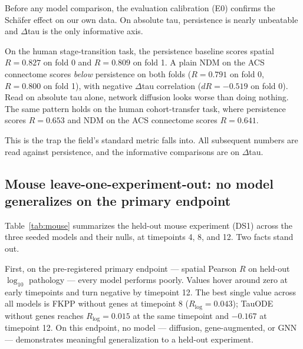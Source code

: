 \documentclass{article}
\begin{document}
Before any model comparison, the evaluation calibration (E0) confirms the Sch\"afer effect on our own data. On absolute tau, persistence is nearly unbeatable and $\Delta$tau is the only informative axis.

On the human stage-transition task, the persistence baseline scores spatial $R = 0.827$ on fold 0 and $R = 0.809$ on fold 1. A plain NDM on the ACS connectome scores \textit{below} persistence on both folds ($R = 0.791$ on fold 0, $R = 0.800$ on fold 1), with negative $\Delta$tau correlation ($dR = -0.519$ on fold 0). Read on absolute tau alone, network diffusion looks worse than doing nothing. The same pattern holds on the human cohort-transfer task, where persistence scores $R = 0.653$ and NDM on the ACS connectome scores $R = 0.641$.

This is the trap the field's standard metric falls into. All subsequent numbers are read against persistence, and the informative comparisons are on $\Delta$tau.

\subsection{Mouse leave-one-experiment-out: no model generalizes on the primary endpoint}

Table~\ref{tab:mouse} summarizes the held-out mouse experiment (DS1) across the three seeded models and their nulls, at timepoints 4, 8, and 12. Two facts stand out.

First, on the pre-registered primary endpoint --- spatial Pearson $R$ on held-out $\log_{10}$ pathology --- every model performs poorly. Values hover around zero at early timepoints and turn negative by timepoint 12. The best single value across all models is FKPP without genes at timepoint 8 ($R_{\log} = 0.043$); TauODE without genes reaches $R_{\log} = 0.015$ at the same timepoint and $-0.167$ at timepoint 12. On this endpoint, no model --- diffusion, gene-augmented, or GNN --- demonstrates meaningful generalization to a held-out experiment.
\end{document}
